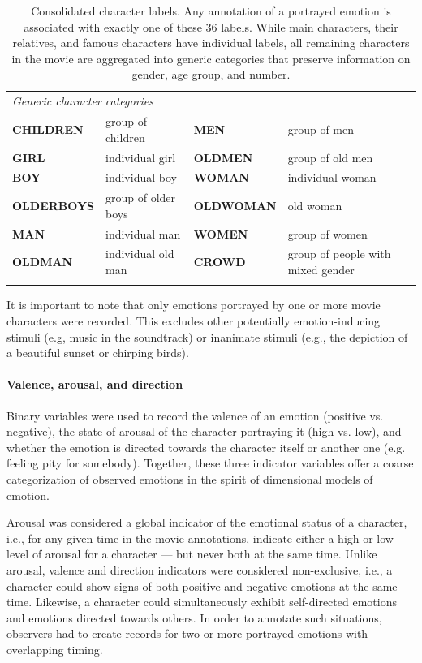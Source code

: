 \documentclass[10pt,a4paper,twocolumn]{article}
\begin{document}
\begin{table}
\begin{tabular}{p{4cm}p{4cm}p{3.6cm}p{4cm}}
\multicolumn{4}{l}{\textit{Generic character categories}} \\
\textbf{CHILDREN}  & group of children & \textbf{MEN}      & group of men \\
\textbf{GIRL}      & individual girl & \textbf{OLDMEN}   & group of old men \\
\textbf{BOY}       & individual boy & \textbf{WOMAN}    & individual woman \\
\textbf{OLDERBOYS} & group of older boys & \textbf{OLDWOMAN} & old woman\\
\textbf{MAN}       & individual man & \textbf{WOMEN}    & group of women \\
\textbf{OLDMAN}    & individual old man & \textbf{CROWD}    & group of people with mixed gender \\
 \\\hline
  \end{tabular}
  \caption{Consolidated character labels. Any annotation of a portrayed emotion
  is associated with exactly one of these 36 labels. While main characters,
  their relatives, and famous characters have individual labels, all remaining
  characters in the movie are aggregated into generic categories that preserve
  information on gender, age group, and number.}
  \label{tab:characters}
\end{table}

It is important to note that only emotions portrayed by one or more movie
characters were recorded. This excludes other potentially emotion-inducing
stimuli (e.g,  music in the soundtrack) or inanimate stimuli (e.g., the
depiction of a beautiful sunset or chirping birds).

\paragraph{Valence, arousal, and direction}

Binary variables were used to record the valence of an emotion (positive vs.
negative), the state of arousal of the character portraying it (high vs. low),
and whether the emotion is directed towards the character itself or another one
(e.g. feeling pity for somebody). Together, these three indicator variables
offer a coarse categorization of observed emotions in the spirit of dimensional
models of emotion.

Arousal was considered a global indicator of the emotional status of a
character, i.e., for any given time in the movie annotations, indicate either a
high or low level of arousal for a character --- but never both at the same time.
Unlike arousal, valence and direction indicators were considered non-exclusive,
i.e., a character could show signs of both positive and negative emotions at the
same time. Likewise, a character could simultaneously exhibit self-directed
emotions and emotions directed towards others. In order to annotate such
situations, observers had to create records for two or more portrayed emotions
with overlapping timing.
\end{document}
